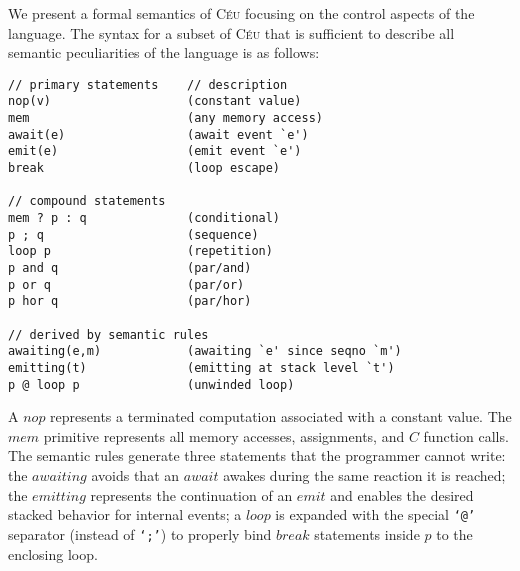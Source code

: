 \documentclass{acm_proc_article-sp}
\newcommand{\CEU}{\textsc{C\'{e}u}\xspace}
\newcommand{\code}[1] {{\small{\texttt{#1}}}}
\newcommand{\1}{\;}
\newcommand{\2}{\;\;}
\newcommand{\3}{\;\;\;}
\newcommand{\5}{\;\;\;\;\;}
\begin{document}
We present a formal semantics of \CEU focusing on the control aspects of the 
language.
%
%
The syntax for a subset of \CEU that is sufficient to describe all semantic 
peculiarities of the language is as follows:
%
{\small
\begin{verbatim}
// primary statements    // description
nop(v)                   (constant value)
mem                      (any memory access)
await(e)                 (await event `e')
emit(e)                  (emit event `e')
break                    (loop escape)

// compound statements
mem ? p : q              (conditional)
p ; q                    (sequence)
loop p                   (repetition)
p and q                  (par/and)
p or q                   (par/or)
p hor q                  (par/hor)

// derived by semantic rules
awaiting(e,m)            (awaiting `e' since seqno `m')
emitting(t)              (emitting at stack level `t')
p @ loop p               (unwinded loop)
\end{verbatim}
}%
%
A $nop$ represents a terminated computation associated with a constant value.
The $mem$ primitive represents all memory accesses, assignments, and $C$ 
function calls.
%
%
The semantic rules generate three statements that the programmer cannot write:
the $awaiting$ avoids that an $await$ awakes during the same reaction it is 
reached;
the $emitting$ represents the continuation of an $emit$ and enables the desired 
stacked behavior for internal events;
a $loop$ is expanded with the special \code{`@'} separator (instead of 
\code{`;'}) to properly bind $break$ statements inside $p$ to the enclosing 
loop.

\end{document}
